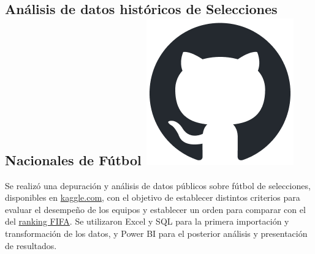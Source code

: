 

\subsection{Análisis de datos históricos de Selecciones Nacionales de Fútbol 
\hspace{0.1 cm} \href{https://github.com/juanjogervasio/Data-Analytics-Coderhouse}{\includegraphics[scale=0.2]{github-mark.png}}
}
Se realizó una depuración y análisis de datos públicos sobre fútbol de selecciones, disponibles en \href{https://www.kaggle.com/datasets/martj42/international-football-results-from-1872-to-2017}{kaggle.com}, con el objetivo de establecer distintos criterios para evaluar el desempeño de los equipos y establecer un orden para comparar con el del \href{https://www.kaggle.com/datasets/cashncarry/fifaworldranking}{ranking FIFA}. Se utilizaron Excel y SQL para la primera importación y transformación de los datos, y Power BI para el posterior análisis y presentación de resultados.

\vspace{0.1 cm}

